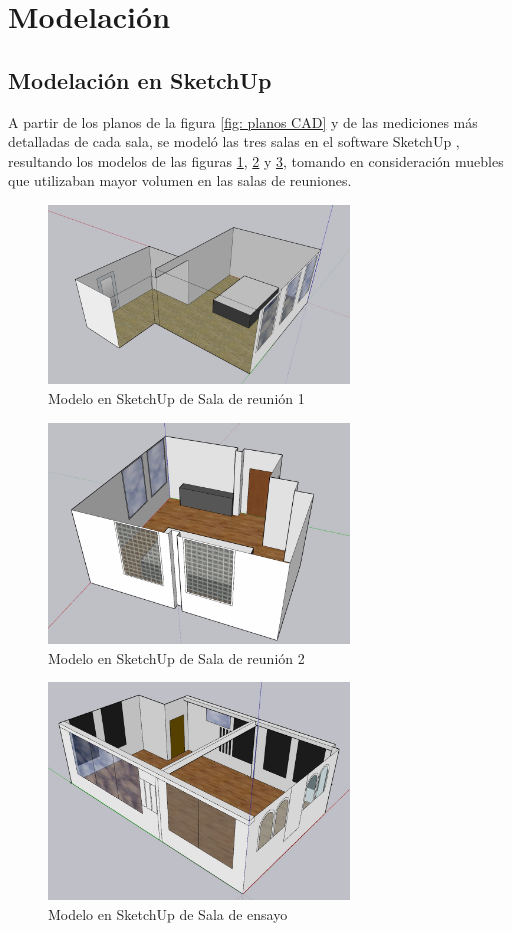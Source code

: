 \section{Modelación}
\subsection{Modelación en SketchUp}
A partir de los planos de la figura \ref{fig: planos CAD} y de las mediciones más detalladas de cada sala, se modeló las tres salas en el software SketchUp \cite{sketchup}, resultando los modelos de las figuras \ref{fig: sketchup sala 1}, \ref{fig: sketchup sala 2} y \ref{fig: sketchup sala de ensayo}, tomando en consideración muebles que utilizaban mayor volumen en las salas de reuniones. 
\begin{figure}[H]
    \centering
    \includegraphics[width=8cm]{Imagenes/Modelacion/Sala 1 Sketchup.png}
    \caption{Modelo en SketchUp de Sala de reunión 1}
    \label{fig: sketchup sala 1}
\end{figure}

\begin{figure}[H]
    \centering
    \includegraphics[width=8cm]{Imagenes/Modelacion/Sala 2 Sketchup.png}
    \caption{Modelo en SketchUp de Sala de reunión 2}
    \label{fig: sketchup sala 2}
\end{figure}

\begin{figure}[H]
    \centering
    \includegraphics[width=8cm]{Imagenes/Modelacion/Sala ensayo Sketchup.jpg}
    \caption{Modelo en SketchUp de Sala de ensayo}
    \label{fig: sketchup sala de ensayo}
\end{figure}

